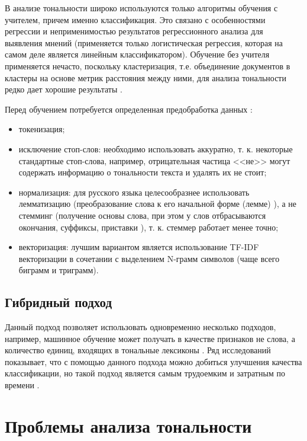 \documentclass[a4paper,14pt, unknownkeysallowed]{extreport}
\begin{document}
	В анализе тональности широко используются только алгоритмы обучения с учителем, причем именно классификация. Это связано с особенностями регрессии и неприменимостью результатов регрессионного анализа для выявления мнений (применяется только логистическая регрессия, которая на самом деле является линейным классификатором). Обучение без учителя применяется нечасто, поскольку кластеризация, т.е. объединение документов в кластеры на основе метрик расстояния между ними, для анализа тональности редко дает хорошие результаты \cite{Semina2}.
	
	Перед обучением потребуется определенная предобработка данных \cite{Volkova}:
	\begin{itemize}
		\item токенизация;
		\item исключение стоп-слов: необходимо использовать аккуратно, т. к. некоторые стандартные стоп-слова, например, отрицательная частица <<не>> могут содержать информацию о тональности текста и удалять их не стоит;
		\item нормализация: для русского языка целесообразнее использовать лемматизацию (преобразование слова к его
		начальной форме (лемме) \cite{Dvoinikova}), а не стемминг (получение основы слова,
		при этом у слов отбрасываются окончания, суффиксы, приставки \cite{Dvoinikova}), т. к. стеммер работает менее точно;
		\item векторизация: лучшим вариантом является использование TF-IDF векторизации в сочетании с выделением N-грамм символов (чаще всего биграмм и триграмм).
	\end{itemize}
	
	\subsection{Гибридный подход}
	
	Данный подход позволяет использовать одновременно несколько подходов, например, машинное обучение может получать в качестве признаков не слова, а количество единиц, входящих в тональные лексиконы \cite{Poletaeva}. Ряд исследований показывает, что с помощью данного подхода можно добиться улучшения качества классификации, но такой подход является самым трудоемким и затратным по времени \cite{Samigulin}.


\section{Проблемы анализа тональности}
\end{document}
